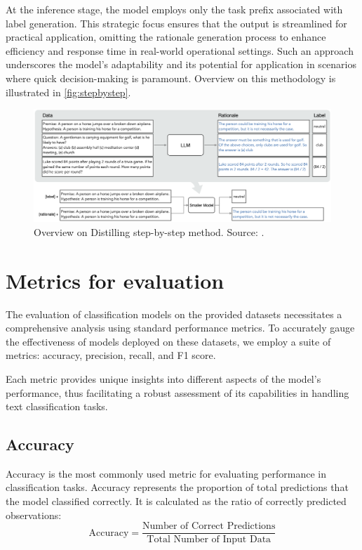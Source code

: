 At the inference stage, the model employs only the task prefix associated with label generation. This strategic focus ensures that the output is streamlined for practical application, omitting the rationale generation process to enhance efficiency and response time in real-world operational settings. Such an approach underscores the model's adaptability and its potential for application in scenarios where quick decision-making is paramount. Overview on this methodology is illustrated in \autoref{fig:stepbystep}.

\begin{figure}[hbt]
    \centering
    \includegraphics[width=0.99\linewidth]{figs/stepbystep.png}
    \caption[Overview on Distilling step-by-step method.]{Overview on Distilling step-by-step method. Source: \cite{stepbystep}.}
    \label{fig:stepbystep}
\end{figure}

\section{Metrics for evaluation}

The evaluation of classification models on the provided datasets necessitates a comprehensive analysis using standard performance metrics. To accurately gauge the effectiveness of models deployed on these datasets, we employ a suite of metrics: accuracy, precision, recall, and F1 score.

Each metric provides unique insights into different aspects of the model's performance, thus facilitating a robust assessment of its capabilities in handling text classification tasks.

\subsection{Accuracy}

Accuracy is the most commonly used metric for evaluating performance in classification tasks. Accuracy represents the proportion of total predictions that the model classified correctly. It is calculated as the ratio of correctly predicted observations:
$$
    \text{Accuracy} = \frac{\text{Number of Correct Predictions}}{\text{Total Number of Input Data}}
$$

